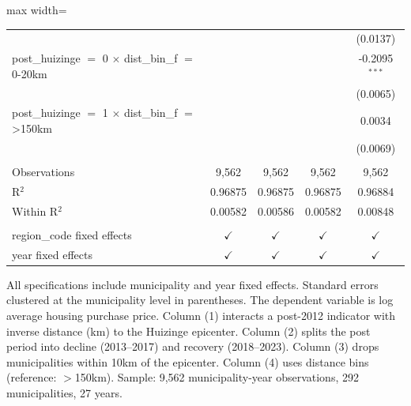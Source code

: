 \begin{table}[htbp]
\begin{adjustbox}{max width=\textwidth}
\begin{tabular}{lcccc}
                                                                   &               &               &               & (0.0137)\\   
      post\_huizinge $=$ 0 $\times$ dist\_bin\_f $=$ 0-20km        &               &               &               & -0.2095$^{***}$\\   
                                                                   &               &               &               & (0.0065)\\   
      post\_huizinge $=$ 1 $\times$ dist\_bin\_f $=$ >150km        &               &               &               & 0.0034\\   
                                                                   &               &               &               & (0.0069)\\   
       \\
      Observations                                                 & 9,562         & 9,562         & 9,562         & 9,562\\  
      R$^2$                                                        & 0.96875       & 0.96875       & 0.96875       & 0.96884\\  
      Within R$^2$                                                 & 0.00582       & 0.00586       & 0.00582       & 0.00848\\  
       \\
      region\_code fixed effects                                   & $\checkmark$  & $\checkmark$  & $\checkmark$  & $\checkmark$\\   
      year fixed effects                                           & $\checkmark$  & $\checkmark$  & $\checkmark$  & $\checkmark$\\   
      \bottomrule
   \end{tabular}
   \end{adjustbox}
   
   \par \raggedright 
   All specifications include municipality and year fixed effects. Standard errors clustered at the municipality level in parentheses. The dependent variable is log average housing purchase price. Column (1) interacts a post-2012 indicator with inverse distance (km) to the Huizinge epicenter. Column (2) splits the post period into decline (2013--2017) and recovery (2018--2023). Column (3) drops municipalities within 10km of the epicenter. Column (4) uses distance bins (reference: $>$150km). Sample: 9,562 municipality-year observations, 292 municipalities, 27 years.
\end{table}
